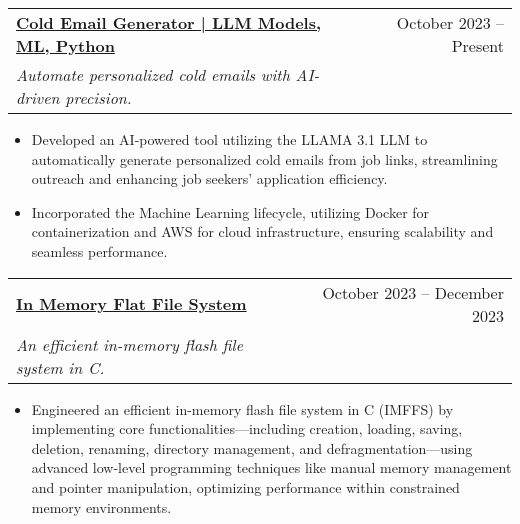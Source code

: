 \documentclass[letterpaper,11pt]{article}
\makeatletter
\newcommand{\resumeItem}[1]{
  \item\small{
    {#1 \vspace{-2pt}}
  }
}
\newcommand{\resumeSubheading}[4]{
  \vspace{-2pt}\item
    \begin{tabular*}{0.97\textwidth}[t]{l@{\extracolsep{\fill}}r}
      \textbf{#1} & #2 \\
      \textit{\small#3} & \textit{\small #4} \\
    \end{tabular*}\vspace{-4pt} %
}
\newcommand{\resumeSubHeadingListEnd}{\end{itemize}}
\newcommand{\resumeItemListStart}{\begin{itemize}}
\newcommand{\resumeItemListEnd}{\end{itemize}\vspace{-6pt}} %
\makeatother
\begin{document}
    \resumeSubheading
      {\href{http://52.183.47.158}{Cold Email Generator | LLM Models, ML, Python}}{October 2023 -- Present}
      {Automate personalized cold emails with AI-driven precision.}{}
      \resumeItemListStart
        \resumeItem{Developed an AI-powered tool utilizing the LLAMA 3.1 LLM to automatically generate personalized cold emails from job links, streamlining outreach and enhancing job seekers' application efficiency.}
        \resumeItem{Incorporated the Machine Learning lifecycle, utilizing Docker for containerization and AWS for cloud infrastructure, ensuring scalability and seamless performance.}
      \resumeItemListEnd

      \vspace{-2pt} %

    \resumeSubheading
      {\href{https://github.com/Ali90922/In-memory-flat-file-system}{In Memory Flat File System}}{October 2023 -- December 2023}
      {An efficient in-memory flash file system in C.}{}
      \resumeItemListStart
        \resumeItem{Engineered an efficient in-memory flash file system in C (IMFFS) by implementing core functionalities—including creation, loading, saving, deletion, renaming, directory management, and defragmentation—using advanced low-level programming techniques like manual memory management and pointer manipulation, optimizing performance within constrained memory environments.}
      
\resumeSubHeadingListEnd
\end{document}
